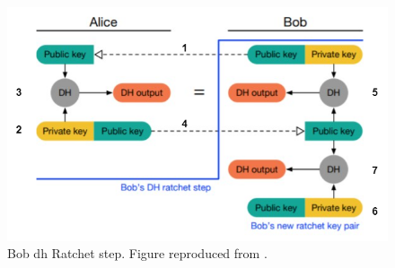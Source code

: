 \begin{figure}[hptb]
	\centering
	\includegraphics[scale=0.6]{Images/dr-bobRatchet.png}
	\caption{Bob \gls{dh} Ratchet step. Figure reproduced from \cite{dblRtcht}.}
	\label{fig:dh-bobRatchet}
\end{figure}

